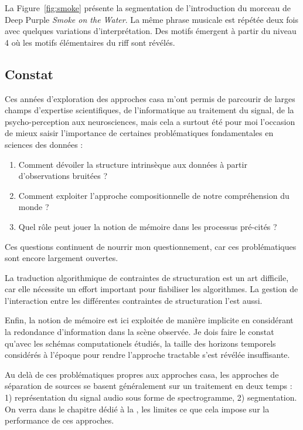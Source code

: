 La Figure~\ref{fig:smoke} présente la segmentation de l'introduction du morceau de Deep Purple \emph{Smoke on the Water}. La même phrase musicale est répétée deux fois avec quelques variations d'interprétation. Des motifs émergent à partir du niveau 4 où les motifs élémentaires du riff sont révélés.

\subsection{Constat}

Ces années d'exploration des approches casa m'ont permis de parcourir de larges champs d'expertise scientifiques, de l'informatique au traitement du signal, de la psycho-perception aux neurosciences, mais cela a surtout été pour moi l'occasion de mieux saisir l'importance de certaines problématiques fondamentales en sciences des données :
\begin{enumerate}
  \item Comment dévoiler la structure intrinsèque aux données à partir d'observations bruitées ?
  \item Comment exploiter l'approche compositionnelle de notre compréhension du monde ?
  \item Quel rôle peut jouer la notion de mémoire dans les processus pré-cités ?
\end{enumerate}
Ces questions continuent de nourrir mon questionnement, car ces problématiques sont encore largement ouvertes.

La traduction algorithmique de contraintes de structuration est un art difficile, car elle nécessite un effort important pour fiabiliser les algorithmes. La gestion de l'interaction entre les différentes contraintes de structuration l'est aussi.

Enfin, la notion de mémoire est ici exploitée de manière implicite en considérant la redondance d'information dans la scène observée. Je dois faire le constat qu'avec les schémas computationels étudiés, la taille des horizons temporels considérés à l'époque pour rendre l'approche tractable s'est révélée insuffisante.



Au delà de ces problématiques propres aux approches casa, les approches de séparation de sources se basent généralement sur un traitement en deux temps : 1) représentation du signal audio sous forme de spectrogramme, 2) segmentation. On verra dans le chapitre dédié à la , les limites ce que cela impose sur la performance de ces approches.

